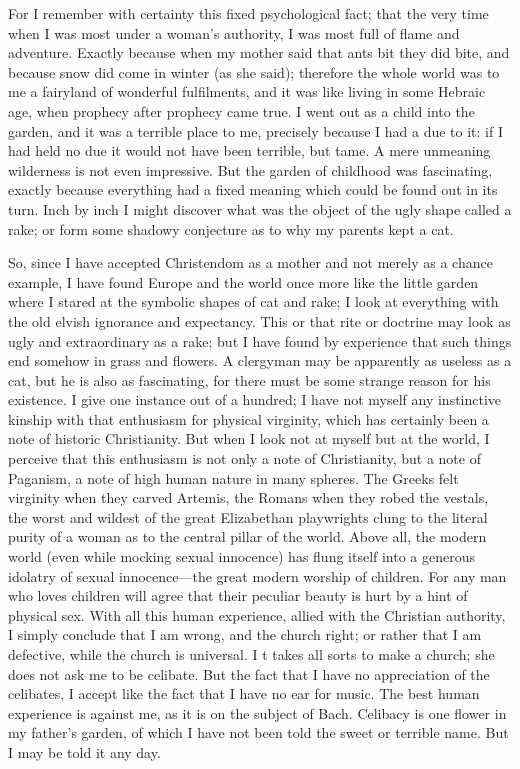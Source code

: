\documentclass{book}
\begin{document}
For I remember with certainty this fixed psychological fact; that the very time when I was most under a woman’s authority, I was most full of flame and adventure. Exactly because when my mother said that ants bit they did bite, and because snow did come in winter (as she said); therefore the whole world was to me a fairyland of wonderful fulfilments, and it was like living in some Hebraic age, when prophecy after prophecy came true. I went out as a child into the garden, and it was a terrible place to me, precisely because I had a due to it: if I had held no due it would not have been terrible, but tame. A mere unmeaning wilderness is not even impressive. But the garden of childhood was fascinating, exactly because everything had a fixed meaning which could be found out in its turn. Inch by inch I might discover what was the object of the ugly shape called a rake; or form some shadowy conjecture as to why my parents kept a cat.

So, since I have accepted Christendom as a mother and not merely as a chance example, I have found Europe and the world once more like the little garden where I stared at the symbolic shapes of cat and rake; I look at everything with the old elvish ignorance and expectancy. This or that rite or doctrine may look as ugly and extraordinary as a rake; but I have found by experience that such things end somehow in grass and flowers. A clergyman may be apparently as useless as a cat, but he is also as fascinating, for there must be some strange reason for his existence. I give one instance out of a hundred; I have not myself any instinctive kinship with that enthusiasm for physical virginity, which has certainly been a note of historic Christianity. But when I look not at myself but at the world, I perceive that this enthusiasm is not only a note of Christianity, but a note of Paganism, a note of high human nature in many spheres. The Greeks felt virginity when they carved Artemis, the Romans when they robed the vestals, the worst and wildest of the great Elizabethan playwrights clung to the literal purity of a woman as to the central pillar of the world. Above all, the modern world (even while mocking sexual innocence) has flung itself into a generous idolatry of sexual innocence—the great modern worship of children. For any man who loves children will agree that their peculiar beauty is hurt by a hint of physical sex. With all this human experience, allied with the Christian authority, I simply conclude that I am wrong, and the church right; or rather that I am defective, while the church is universal. I t takes all sorts to make a church; she does not ask me to be celibate. But the fact that I have no appreciation of the celibates, I accept like the fact that I have no ear for music. The best human experience is against me, as it is on the subject of Bach. Celibacy is one flower in my father’s garden, of which I have not been told the sweet or terrible name. But I may be told it any day.
\end{document}
